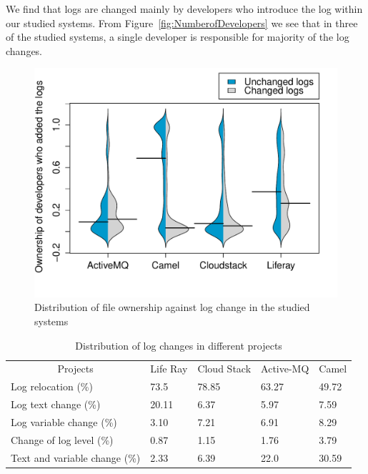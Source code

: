 We find that logs are changed mainly by developers who introduce the log within our studied systems. From Figure~\ref{fig:NumberofDevelopers} we see that in three of the studied systems, a single developer is responsible for majority of the log changes. 
\begin{figure}[tb]
\centering
\includegraphics[width=1\linewidth]{ChangedvsUnchangedlogs}
\caption{Distribution of file ownership against log change in the studied systems}
\label{fig:ChangedvsUnchangedlogs}
\end{figure}


\begin{table}[t]
	\centering
	\caption{Distribution of log changes in different projects}
	\label{tba:logtype}
	\begin{tabular}{l|llll}
		\cline{1-5}  	\multicolumn{1}{|c}{Projects}    & \multicolumn{1}{|c}{ Life Ray }  &  \multicolumn{1}{|c}{ Cloud Stack}	   &  \multicolumn{1}{|c}{ Active-MQ }  & 
		 \multicolumn{1}{|c|}{ Camel } \\ \cline{1-5}   
		
		Log relocation (\%)       & 73.5     & 78.85 &  63.27  & 49.72         \\
		
		Log text change (\%)      & 20.11    & 6.37 & 5.97    & 7.59       \\
		Log variable change (\%)   & 3.10     & 7.21 & 6.91 &  8.29     \\
		Change of log level (\%) & 0.87   & 1.15 & 1.76  &  3.79       \\ 
		Text and variable change (\%) & 2.33     & 6.39 & 22.0   &  30.59    \\ \cline{1-5}
	\end{tabular}
\end{table}

